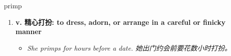 
\begin{frame}
{\huge primp}
\begin{center}
\begin{enumerate}\Large
  \item \textbf{v. 精心打扮: to dress, adorn, or arrange in a careful or finicky manner}
  \begin{itemize}
    \item \em{\Large{She primps for hours before a date. 她出门约会前要花数小时打扮。}}
  \end{itemize}
\end{enumerate}
\end{center}
\end{frame}
